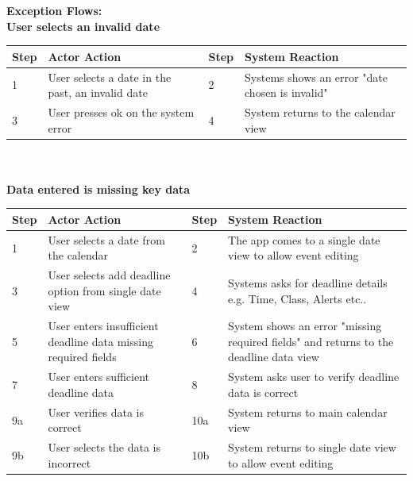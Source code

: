 \documentclass[a4paper]{article}
\begin{document}
\noindent\textbf{Exception Flows:}\\
\textbf{User selects an invalid date}\\
\noindent\begin{tabular}{|m{0.7cm}|m{7.5cm}|m{0.7cm}|m{7.5cm}|}
	\hline
	\textbf{Step} & \textbf{Actor Action} & \textbf{Step} & \textbf{System Reaction} \\
	\hline
	1 & User selects a date in the past, an invalid date & 2 & Systems shows an error "date chosen is invalid"\\
	\hline
	3 & User presses ok on the system error & 4 & System returns to the calendar view\\
	\hline
\end{tabular}
\\
\\
\textbf{Data entered is missing key data}\\
\noindent\begin{tabular}{|m{0.7cm}|m{7.5cm}|m{0.7cm}|m{7.5cm}|}
	\hline
	\textbf{Step} & \textbf{Actor Action} & \textbf{Step} & \textbf{System Reaction} \\
	\hline
	1 & User selects a date from the calendar & 2 & The app comes to a single date view to allow event editing \\
	\hline
	3 & User selects add deadline option from single date view & 4 & Systems asks for deadline details e.g. Time, Class, Alerts etc..\\
	\hline
	5 & User enters insufficient deadline data missing required fields & 6 & System shows an error "missing required fields" and returns to the deadline data view\\
	\hline
	7 & User enters sufficient deadline data & 8 & System asks user to verify deadline data is correct \\
	\hline
	9a & User verifies data is correct & 10a & System returns to main calendar view\\
	\hline
	9b & User selects the data is incorrect & 10b & System returns to single date view to allow event editing\\
	\hline
\end{tabular}
\pagebreak
\end{document}
